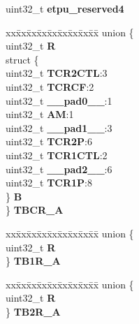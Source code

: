\begin{DoxyCompactItemize}
\begin{tabbing}
\end{tabbing}\item 
\mbox{\label{structETPU__tag_aa291eabba892f127475f9c72a0645a73}} 
uint32\+\_\+t {\bfseries etpu\+\_\+reserved4}
\item 
\mbox{\label{structETPU__tag_a7cda350808d269323b9c38740a7b9c0c}} 
\begin{tabbing}
xx\=xx\=xx\=xx\=xx\=xx\=xx\=xx\=xx\=\kill
union \{\\
\>uint32\_t {\bfseries R}\\
\>struct \{\\
\>\>uint32\_t {\bfseries TCR2CTL}:3\\
\>\>uint32\_t {\bfseries TCRCF}:2\\
\>\>uint32\_t {\bfseries \_\_pad0\_\_}:1\\
\>\>uint32\_t {\bfseries AM}:1\\
\>\>uint32\_t {\bfseries \_\_pad1\_\_}:3\\
\>\>uint32\_t {\bfseries TCR2P}:6\\
\>\>uint32\_t {\bfseries TCR1CTL}:2\\
\>\>uint32\_t {\bfseries \_\_pad2\_\_}:6\\
\>\>uint32\_t {\bfseries TCR1P}:8\\
\>\} {\bfseries B}\\
\} {\bfseries TBCR\_A}\\

\end{tabbing}\item 
\mbox{\label{structETPU__tag_a10ade797d62c6115cf7fd2a49357ed65}} 
\begin{tabbing}
xx\=xx\=xx\=xx\=xx\=xx\=xx\=xx\=xx\=\kill
union \{\\
\>uint32\_t {\bfseries R}\\
\} {\bfseries TB1R\_A}\\

\end{tabbing}\item 
\mbox{\label{structETPU__tag_a069c03f837c7d75f255e5a42af96a053}} 
\begin{tabbing}
xx\=xx\=xx\=xx\=xx\=xx\=xx\=xx\=xx\=\kill
union \{\\
\>uint32\_t {\bfseries R}\\
\} {\bfseries TB2R\_A}\\


\end{tabbing}
\end{DoxyCompactItemize}
